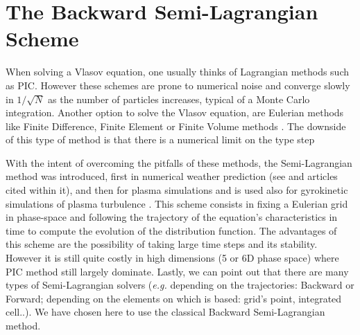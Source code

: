\documentclass[proc]{edpsmath}
\begin{document}


\section{The Backward Semi-Lagrangian Scheme}
\label{sec:BSL_scheme}

When solving a Vlasov equation, one usually thinks of Lagrangian methods such as PIC\cite{Birdsall:1985:PPV:577251}. However  these schemes are prone to numerical noise and converge slowly in $1/\sqrt{N}$ as the number of particles increases, typical of a Monte Carlo integration. Another option to solve the Vlasov equation, are Eulerian methods like Finite Difference, Finite Element or Finite Volume methods
 \cite{filbet2003, Zaki1988184, banks2010}. The downside of this type of method is that there is a numerical limit on the type step

With the intent of overcoming  the pitfalls of these methods, the Semi-Lagrangian method was introduced, first in numerical weather prediction (see \cite{Kalnay03atmosphericmodeling} and articles cited within it), and then   for plasma simulations \cite{Sonnendrucker1999201, Cheng1976330} and is used also for gyrokinetic simulations of plasma turbulence \cite{grandgirard2006,kwon2015}.
This scheme consists in fixing a Eulerian grid in phase-space and following the trajectory of the equation's characteristics in time to compute the evolution of the distribution function. The advantages of this scheme are the possibility of taking large time steps and its stability. However it is still quite costly in  high dimensions (5 or 6D phase space) where PIC method still largely dominate.
 Lastly, we can point out that there are many types of Semi-Lagrangian solvers (\emph{e.g.} depending on the trajectories: Backward or Forward;  depending on the elements on which is based: grid's point, integrated cell..). We have chosen here to use the classical Backward Semi-Lagrangian method. 
\end{document}
